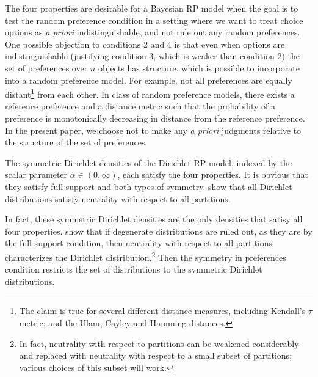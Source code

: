 \documentclass[11pt,letter]{article}
\newcommand{\Dpi}{Dirichlet RP model}
\begin{document}
The four properties are desirable for a Bayesian RP model when the goal is to test the random preference condition in a setting where we want to treat choice options as {\em a priori} indistinguishable, and not rule out any random preferences.
One possible objection to conditions 2 and 4 is that even when options are indistinguishable (justifying condition 3, which is weaker than condition 2) the set of preferences over $n$ objects has structure, which is possible to incorporate into a random preference model.
For example, not all preferences are equally distant\footnote{The claim is true for several different distance measures, including Kendall's $\tau$ metric; and the Ulam, Cayley and Hamming distances.} from each other.
In  class of random preference models, there exists a reference preference and a distance metric such that the probability of a preference is monotonically decreasing in distance from the reference preference.
In the present paper, we choose not to make any {\em a priori} judgments relative to the structure of the set of preferences.

The symmetric Dirichlet densities of the \Dpi{}, indexed by the scalar parameter $\alpha \in (0,\infty)$, each satisfy the four properties.
It is obvious that they satisfy full support and both types of symmetry.
 show that all Dirichlet distributions satisfy neutrality with respect to all partitions.

In fact, these symmetric Dirichlet densities are the only densities that satisy all four properties.
 show that if degenerate distributions are ruled out, as they are by the full support condition, then neutrality with respect to all partitions characterizes the Dirichlet distribution.\footnote{In fact, neutrality with respect to partitions can be weakened considerably and replaced with neutrality with respect to a small subset of partitions; various choices of this subset will work.}
Then the symmetry in preferences condition restricts the set of distributions to the symmetric Dirichlet distributions.
\end{document}
